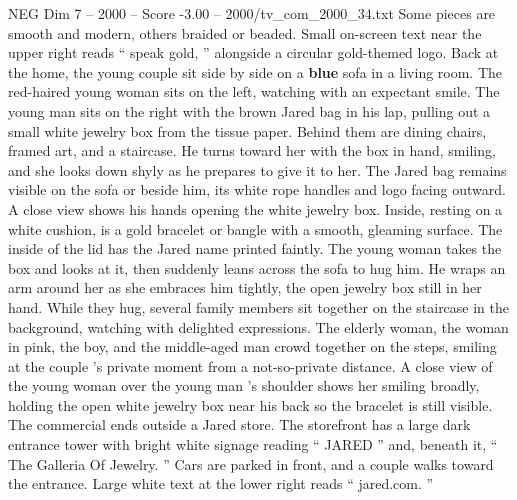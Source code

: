 \begin{textsample}{NEG Dim 7 – 2000 – Score -3.00 – 2000/tv\_com\_2000\_34.txt}
Some pieces are smooth and modern, others braided or beaded.
Small on-screen text near the upper right reads “ speak gold, ” alongside a circular gold-themed logo.
Back at the home, the young couple sit side by side on a \textbf{blue} sofa in a living room.
The red-haired young woman sits on the left, watching with an expectant smile.
The young man sits on the right with the brown Jared bag in his lap, pulling out a small white jewelry box from the tissue paper.
Behind them are dining chairs, framed art, and a staircase.
He turns toward her with the box in hand, smiling, and she looks down shyly as he prepares to give it to her.
The Jared bag remains visible on the sofa or beside him, its white rope handles and logo facing outward.
A close view shows his hands opening the white jewelry box.
Inside, resting on a white cushion, is a gold bracelet or bangle with a smooth, gleaming surface.
The inside of the lid has the Jared name printed faintly.
The young woman takes the box and looks at it, then suddenly leans across the sofa to hug him.
He wraps an arm around her as she embraces him tightly, the open jewelry box still in her hand.
While they hug, several family members sit together on the staircase in the background, watching with delighted expressions.
The elderly woman, the woman in pink, the boy, and the middle-aged man crowd together on the steps, smiling at the couple ’s private moment from a not-so-private distance.
A close view of the young woman over the young man ’s shoulder shows her smiling broadly, holding the open white jewelry box near his back so the bracelet is still visible.
The commercial ends outside a Jared store.
The storefront has a large dark entrance tower with bright white signage reading “ JARED ” and, beneath it, “ The Galleria Of Jewelry. ” Cars are parked in front, and a couple walks toward the entrance.
Large white text at the lower right reads “ jared.com. ”

\end{textsample}

